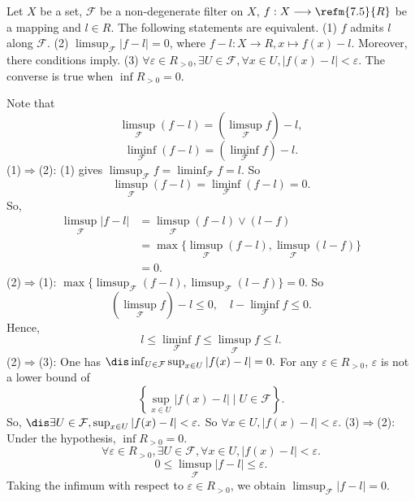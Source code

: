 \begin{theoremenv}
    Let $X$ be a set, $\mathcal{F}$ be a non-degenerate filter on $X$, $f:X\longrightarrow \refm{7.5}{R}$ be a mapping and $l\in R$. The following statements are equivalent.
    \newline
    (1) $f$ admits $l$ along $\mathcal{F}$.
    \newline
    (2) $\limsup_{\mathcal{F}}\left|f-l\right|=0$, where $f-l:X\longrightarrow R, x\longmapsto f(x)-l$. Moreover, there conditions imply.
    \newline
    (3) $\forall \varepsilon\in R_{>0}, \exists U\in \mathcal{F}, \forall x\in U, \left|f(x)-l\right|<\varepsilon.$
    The converse is true when $\inf R_{>0}=0$. 
\end{theoremenv}
\begin{proofenv}
    Note that 
    $$\limsup_{\mathcal{F}}\left(f-l\right)=\left(\limsup_{\mathcal{F}}f\right)-l,$$
    $$\liminf_{\mathcal{F}}\left(f-l\right)=\left(\liminf_{\mathcal{F}}f\right)-l.$$
    (1)$\Rightarrow$(2): (1) gives $\limsup_{\mathcal{F}} f=\liminf_{\mathcal{F}} f=l$. So 
    $$\limsup_{\mathcal{F}}\left(f-l\right)=\liminf_{\mathcal{F}}\left(f-l\right)=0.$$
    So, \begin{align*}
        \limsup_{\mathcal{F}}\left|f-l\right|&=\limsup_\mathcal{F}\left(f-l\right)\vee \left(l-f\right)\\
        &=\max\{\limsup_{\mathcal{F}}(f-l),\limsup_{\mathcal{F}}(l-f)\}\\
        &=0.
    \end{align*}
    (2)$\Rightarrow$(1): $\max\{\limsup_{\mathcal{F}}(f-l),\limsup_{\mathcal{F}}(l-f)\}=0.$ So 
    $$\left(\limsup_{\mathcal{F}}f\right)-l \le 0,\quad l-\liminf_{\mathcal{F}}f\le 0.$$
    Hence, $$l\le \liminf_{\mathcal{F}}f\le \limsup_{\mathcal{F}}f\le l.$$
    (2)$\Rightarrow$(3): One has $\dis \inf_{U\in \mathcal{F}}\sup_{x\in U}\left|f(x)-l\right|=0.$ For any $\varepsilon\in R_{>0}$, $\varepsilon$ is not a lower bound of
    $$\left\{\sup_{x\in U}\left|f(x)-l\right|\mid U\in \mathcal{F}\right\}.$$
    So, $\dis \exists U\in \mathcal{F}, \sup_{x\in U}\left|f(x)-l\right|<\varepsilon.$ So $\forall x\in U, \left|f(x)-l\right|<\varepsilon$.
    \newline
    (3)$\Rightarrow$(2): Under the hypothesis, $\inf R_{>0}=0$. 
    $$\forall \varepsilon \in R_{>0}, \exists U\in \mathcal{F}, \forall x\in U, \left|f(x)-l\right|<\varepsilon.$$ 
    $$0\le \limsup_{\mathcal{F}}\left|f-l\right|\le \varepsilon.$$
    Taking the infimum with respect to $\varepsilon\in R_{>0}$, we obtain $\limsup_{\mathcal{F}}\left|f-l\right|=0.$
\end{proofenv}
